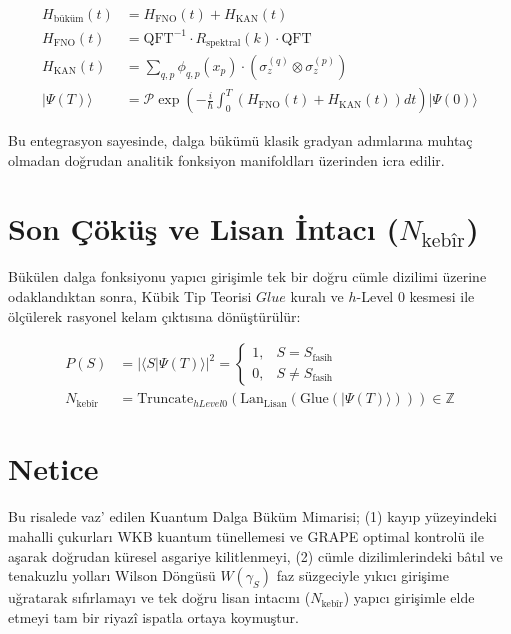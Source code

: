 \documentclass[11pt, a4paper]{article}
\begin{document}
\begin{align}
H_{\text{büküm}}(t) &= H_{\text{FNO}}(t) + H_{\text{KAN}}(t) \\
H_{\text{FNO}}(t) &= \text{QFT}^{-1} \cdot R_{\text{spektral}}(k) \cdot \text{QFT} \\
H_{\text{KAN}}(t) &= \sum_{q, p} \phi_{q,p}(x_p) \cdot (\sigma_z^{(q)} \otimes \sigma_z^{(p)}) \\
|\Psi(T)\rangle &= \mathcal{P} \exp \left( -\frac{i}{\hbar} \int_0^T \left( H_{\text{FNO}}(t) + H_{\text{KAN}}(t) \right) dt \right) |\Psi(0)\rangle
\end{align}

Bu entegrasyon sayesinde, dalga bükümü klasik gradyan adımlarına muhtaç olmadan doğrudan analitik fonksiyon manifoldları üzerinden icra edilir.

\section{Son Çöküş ve Lisan İntacı ($N_{\text{kebîr}}$)}

Bükülen dalga fonksiyonu yapıcı girişimle tek bir doğru cümle dizilimi üzerine odaklandıktan sonra, Kübik Tip Teorisi $Glue$ kuralı ve $h$-Level 0 kesmesi ile ölçülerek rasyonel kelam çıktısına dönüştürülür:

\begin{align}
P(S) &= \left| \langle S | \Psi(T) \rangle \right|^2 = \begin{cases} 1, & S = S_{\text{fasih}} \\ 0, & S \neq S_{\text{fasih}} \end{cases} \\
N_{\text{kebîr}} &= \text{Truncate}_{hLevel 0} \left( \text{Lan}_{\text{Lisan}} \left( \text{Glue}\left( |\Psi(T)\rangle \right) \right) \right) \in \mathbb{Z}
\end{align}

\section{Netice}

Bu risalede vaz' edilen Kuantum Dalga Büküm Mimarisi; (1) kayıp yüzeyindeki mahalli çukurları WKB kuantum tünellemesi ve GRAPE optimal kontrolü ile aşarak doğrudan küresel asgariye kilitlenmeyi, (2) cümle dizilimlerindeki bâtıl ve tenakuzlu yolları Wilson Döngüsü $W(\gamma_S)$ faz süzgeciyle yıkıcı girişime uğratarak sıfırlamayı ve tek doğru lisan intacını ($N_{\text{kebîr}}$) yapıcı girişimle elde etmeyi tam bir riyazî ispatla ortaya koymuştur.
\end{document}
